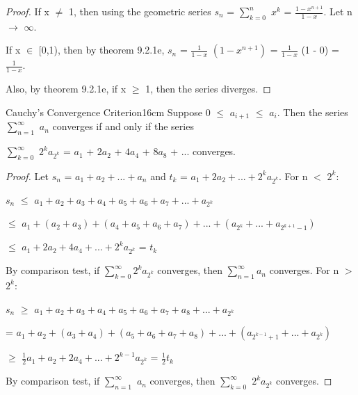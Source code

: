     \begin{proof}
        If x $\not =$ 1, then using the geometric series
        $s_n$ = $\sum_{k=0}^n$ $x^k$ = $\frac{1 - x^{n+1}}{1 - x}$.
        Let n $\rightarrow$ $\infty$.

        If x $\in$ [0,1), then by {\color{red} theorem 9.2.1e},
        $s_n$ = $\frac{1}{1-x}$ $(1 - x^{n+1})$
        = $\frac{1}{1-x}$ (1 - 0) = $\frac{1}{1-x}$.

        Also, by {\color{red} theorem 9.2.1e}, if x $\geq$ 1,
        then the series diverges.        
    \end{proof}

    \vspace{0.5cm}



    \begin{wtheorem}{Cauchy's Convergence Criterion}{16cm}
        Suppose 0 $\leq$ $a_{i+1}$ $\leq$ $a_{i}$.
        Then the series $\sum_{n=1}^{\infty}$ $a_n$ converges
        if and only if the series

        \hspace{0.5cm}
        $\sum_{k=0}^{\infty}$ $2^k a_{2^k}$
        = $a_1$ + $2a_2$ + $4a_4$ + $8a_8$ + ...
        converges.
    \end{wtheorem}
    
    \begin{proof}
        Let $s_n$ = $a_1 + a_2 + ... + a_n$ and
        $t_k$ = $a_1 + 2a_2 + ... + 2^ka_{2^k}$.
        For n $<$ $2^k$:

        \hspace{1cm}
        $s_n$
        $\leq$ $a_1 + a_2 + a_3 + a_4 + a_5 + a_6 + a_7 + ... + a_{2^k}$

        \hspace{1.55cm}
        $\leq$ $a_1 + (a_2 + a_3) + (a_4 + a_5 + a_6 + a_7)
                    + ... + (a_{2^k} + ... + a_{2^{k+1} - 1})$

        \hspace{1.55cm}
        $\leq$ $a_1 + 2a_2 + 4a_4 + ... + 2^ka_{2^k}$
        = $t_k$

        By {\color{red} comparison test},
        if $\sum_{k=0}^{\infty} 2^k a_{2^k}$ converges, then
        $\sum_{n=1}^{\infty} a_n$ converges.
        For n $>$ $2^k$:

        \hspace{1cm}
        $s_n$
        $\geq$ $a_1 + a_2 + a_3 + a_4 + a_5 + a_6 + a_7 + a_8 + ... + a_{2^k}$

        \hspace{1.55cm}
        = $a_1 + a_2 + (a_3 + a_4) + (a_5 + a_6 + a_7 + a_8)
                    + ... + (a_{2^{k-1} + 1} + ... + a_{2^k})$

        \hspace{1.55cm}
        $\geq$ $\frac{1}{2}a_1 + a_2 + 2a_4 + ... + 2^{k-1}a_{2^k}$
        = $\frac{1}{2}t_k$

        By {\color{red} comparison test},
        if $\sum_{n=1}^{\infty}$ $a_n$ converges, then
        $\sum_{k=0}^{\infty}$ $2^k a_{2^k}$ converges.
    \end{proof}

